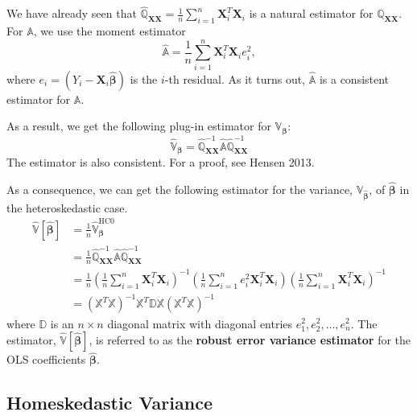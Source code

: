 \documentclass[
]{book}
\theoremstyle{definition}
\theoremstyle{definition}
\theoremstyle{definition}
\theoremstyle{definition}
\theoremstyle{remark}
\begin{document}
We have already seen that \(\widehat{{\mathbb{Q}}}_{{\boldsymbol{XX}}}=\frac{1}{n}\sum\limits_{i=1}^n{\boldsymbol{X}}_i^T{\boldsymbol{X}}_i\) is a natural estimator for \({\mathbb{Q}}_{{\boldsymbol{XX}}}\). For \({\mathbb{A}}\), we use the moment estimator
\[
\widehat{{\mathbb{A}}}=\frac{1}{n}\sum\limits_{i=1}^n{\boldsymbol{X}}_i^T{\boldsymbol{X}}_ie_i^2,
\]
where \(e_i=(Y_i-{\boldsymbol{X}}_i\widehat{{\boldsymbol{\beta}}})\) is the \(i\)-th residual. As it turns out, \(\widehat{{\mathbb{A}}}\) is a consistent estimator
for \({\mathbb{A}}\).

As a result, we get the following plug-in estimator for \({\mathbb{V}}_{{\boldsymbol{\beta}}}\):
\[
\widehat{{\mathbb{V}}}_{{\boldsymbol{\beta}}}=
\widehat{{\mathbb{Q}}}_{{\boldsymbol{XX}}}^{-1}\widehat{{\mathbb{A}}}\widehat{{\mathbb{Q}}}_{{\boldsymbol{XX}}}^{-1}
\]
The estimator is also consistent. For a proof, see Hensen 2013.

As a consequence, we can get the following estimator for the variance, \({\mathbb{V}}_{\widehat{{\boldsymbol{\beta}}}}\), of \(\widehat{{\boldsymbol{\beta}}}\) in the heteroskedastic case.
\[
\begin{aligned}
\widehat{{\mathbb{V}}}\left[\widehat{{\boldsymbol{\beta}}}\right]
&=\frac{1}{n}\widehat{{\mathbb{V}}}_{{\boldsymbol{\beta}}}^{\text{HC0}} \\
&=\frac{1}{n}\widehat{{\mathbb{Q}}}_{{\boldsymbol{XX}}}^{-1}\widehat{{\mathbb{A}}}\widehat{{\mathbb{Q}}}_{{\boldsymbol{XX}}}^{-1} \\
&=\frac{1}{n}\left(\frac{1}{n}\sum\limits_{i=1}^n{\boldsymbol{X}}_i^T{\boldsymbol{X}}_i\right)^{-1}
\left(\frac{1}{n}\sum\limits_{i=1}^ne_i^2{\boldsymbol{X}}_i^T{\boldsymbol{X}}_i\right)
\left(\frac{1}{n}\sum\limits_{i=1}^n{\boldsymbol{X}}_i^T{\boldsymbol{X}}_i\right)^{-1} \\
&=\left({\mathbb{X}}^T{\mathbb{X}}\right)^{-1}
{\mathbb{X}}^T{\mathbb{D}}{\mathbb{X}}
\left({\mathbb{X}}^T{\mathbb{X}}\right)^{-1}
\end{aligned}
\]
where \({\mathbb{D}}\) is an \(n\times n\) diagonal matrix with diagonal entries \(e_1^2,e_2^2,\ldots,e_n^2\).
The estimator, \(\widehat{{\mathbb{V}}}\left[\widehat{{\boldsymbol{\beta}}}\right]\), is referred to as the \textbf{robust error variance estimator} for the OLS coefficients \(\widehat{{\boldsymbol{\beta}}}\).

\hypertarget{homeskedastic-variance}{%
\subsection{Homeskedastic Variance}\label{homeskedastic-variance}}
\end{document}
